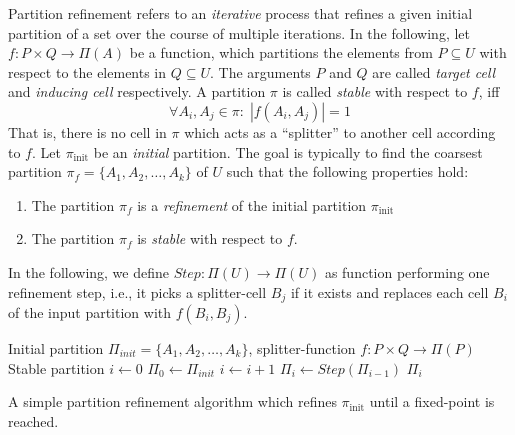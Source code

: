 		Partition refinement refers to an \textit{iterative} process that refines a given initial partition of a set over the course of multiple iterations.
		In the following, let $f: P \times Q \rightarrow \Pi(A)$ be a function, which partitions the elements from $P \subseteq U$ with respect to the elements in $Q \subseteq U$. The arguments $P$ and $Q$ are called \textit{target cell} and \textit{inducing cell} respectively.
		A partition $\pi$ is called \textit{stable} with respect to $f$, iff
		\begin{equation*}
			\forall A_i, A_j \in \pi: \; |f(A_i, A_j)| = 1
		\end{equation*}
		That is, there is no cell in $\pi$ which acts as a \enquote{splitter} to another cell according to $f$.
		Let $\pi_{\mathrm{init}}$ be an \textit{initial} partition. The goal is typically to find the coarsest partition $\pi_f = \{ A_1, A_2, \ldots, A_k \}$ of $U$ such that the following properties hold:

		\begin{enumerate}
			\item The partition $\pi_f$ is a \textit{refinement} of the initial partition $\pi_{\mathrm{init}}$
			\item The partition $\pi_f$ is \textit{stable} with respect to $f$.
		\end{enumerate}

		In the following, we define $Step: \Pi(U) \rightarrow \Pi(U)$ as function performing one refinement step, i.e., it picks a splitter-cell $B_j$ if it exists and replaces each cell $B_i$ of the input partition with $f(B_i, B_j)$.

		\begin{algorithm}[ht!]
			\centering
			\begin{algorithmic}
				\Require Initial partition $\Pi_{init} = \{ A_1, A_2, \ldots, A_k \}$, splitter-function $f: P \times Q \rightarrow \Pi(P)$
				\Ensure Stable partition
				\Statex
					\State $i \gets 0$
					\State $\Pi_0 \gets \Pi_{init}$
					\Repeat
						\State $i \gets i + 1$
						\State $\Pi_i \gets Step(\Pi_{i-1})$
					\State \Return $\Pi_i$
				\EndFunction
			\end{algorithmic}
			\caption{A simple partition refinement algorithm which refines $\pi_{\mathrm{init}}$ until a fixed-point is reached.}
			\label{algo:prelims:refinement}
		\end{algorithm}

